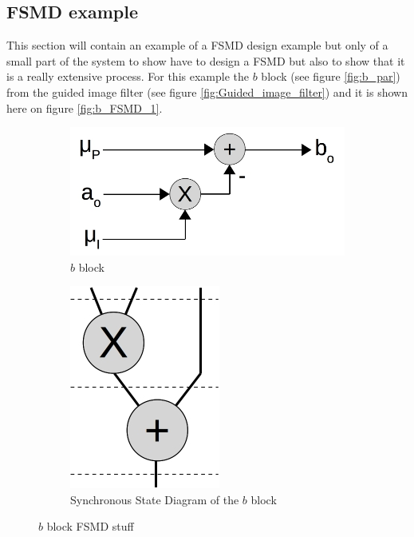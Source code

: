 \subsection{FSMD example}
This section will contain an example of a FSMD design example but only of a small part of the system to show have to design a FSMD but also to show that it is a really extensive process. For this example the $b$ block (see figure \vref{fig:b_par}) from the guided image filter (see figure \vref{fig:Guided_image_filter}) and it is shown here on figure \vref{fig:b_FSMD_1}.
\begin{figure}[ht]
  \centering
  \begin{subfigure}[t]{0.45\textwidth}
    \centering\includegraphics[scale=0.4]{figures/b_FSMD_1}
    \caption{$b$ block\label{fig:b_FSMD_1}}
  \end{subfigure}\hspace{0.5cm}
  \begin{subfigure}[t]{0.45\textwidth}
    \centering\includegraphics[scale=0.4]{figures/b_FSMD_SSD}
    \caption{Synchronous State Diagram of the $b$ block\label{fig:b_FSMD_SSD}}
  \end{subfigure}
  \caption{$b$ block FSMD stuff\label{fig:b_FSMD_1_all}}
\end{figure}

